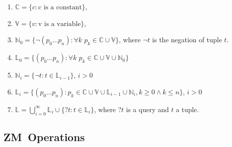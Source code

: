 \documentclass[11pt,a4paper]{report}
\newcommand{\zm}{ZM}
\newcommand{\var}[1]{`#1}
\begin{document}
\begin{enumerate}
\item $\mathbb{C} = \{c: \text{c is a constant} \}$,
\item $\mathbb{V} = \{v: \text{v is a variable} \}$,
\item $\mathbb{N}_{0} = \{\neg (p_{0} \ldots p_{n}): \forall k \, \, p_{k} \in \mathbb{C} \cup \mathbb{V} \}$, where $\neg t$ is the negation of tuple $t$.
\item $\mathbb{L}_{0} = \{(p_{0} \ldots p_{n}) : \forall k \, \, p_{k} \in \mathbb{C} \cup \mathbb{V} \cup \mathbb{N}_{0} \}$

\item $\mathbb{N}_{i} = \{\neg t: t \in \mathbb{L}_{i-1}\}$, $i > 0$
\item $\mathbb{L}_{i} = \{(p_{0} \ldots p_{n}) : p_{k} \in \mathbb{C} \cup \mathbb{V} \cup \mathbb{L}_{i-1} \cup \mathbb{N}_{i}, k \geq 0 \wedge k \leq n \}$, $i > 0$

\item $\mathbb{L} = \bigcup\limits_{i=0}^{\infty} \mathbb{L}_{i} \cup \{?t : t \in \mathbb{L}_{i} \}$, where $?t$ is a query and $t$ a tuple.
\end{enumerate}



\subsection{\zm\ Operations}
\end{document}
